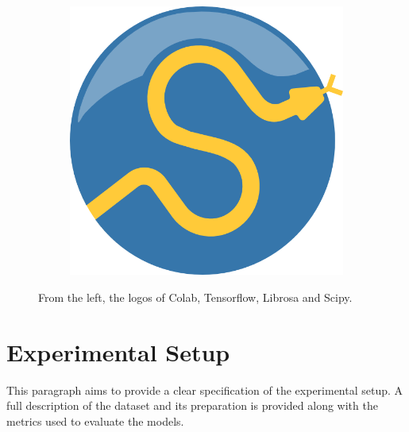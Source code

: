 \begin{figure}[H]
\begin{subfigure}{.25\textwidth}
		\label{fig:librosa_logo}
	\end{subfigure}%
	\begin{subfigure}{.25\textwidth}
		\centering
		\includegraphics[width=.55\linewidth]{img/scipy_logo.png}
		\label{fig:scipy_logo}
	\end{subfigure}
	\caption{From the left, the logos of Colab, Tensorflow, Librosa and Scipy.}
	\label{fig:fig}
\end{figure}

\section{Experimental Setup}
This paragraph aims to provide a clear specification of the experimental setup. A full description of the dataset and its preparation is provided along with the metrics used to evaluate the models. 


